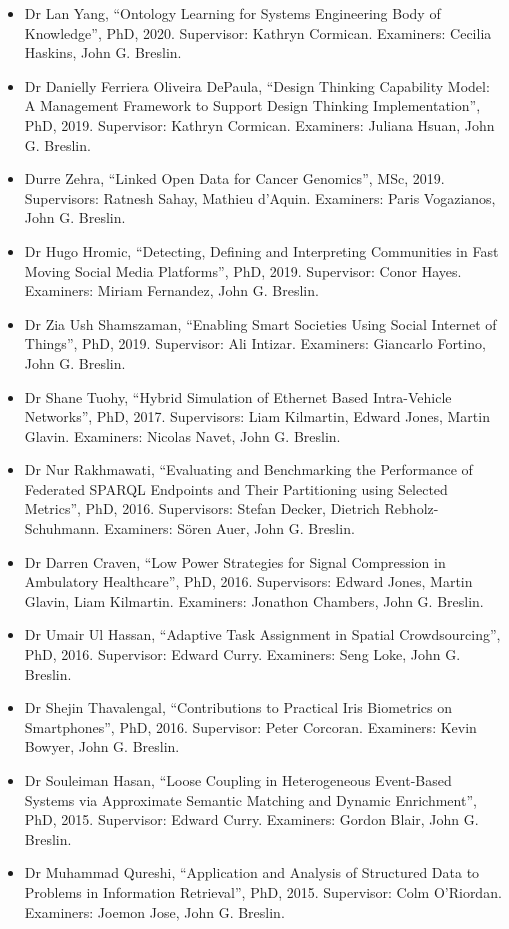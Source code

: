 \documentclass[10pt,a4paper]{res} %
\begin{document}
\begin{resume}
\begin{itemize}
\item Dr Lan Yang, ``Ontology Learning for Systems Engineering Body of Knowledge'', PhD, 2020. Supervisor: Kathryn Cormican. Examiners: Cecilia Haskins, John G. Breslin.
\item Dr Danielly Ferriera Oliveira DePaula, ``Design Thinking Capability Model: A Management Framework to Support Design Thinking Implementation'', PhD, 2019. Supervisor: Kathryn Cormican. Examiners: Juliana Hsuan, John G. Breslin.
\item Durre Zehra, ``Linked Open Data for Cancer Genomics'', MSc, 2019. Supervisors: Ratnesh Sahay, Mathieu d'Aquin. Examiners: Paris Vogazianos, John G. Breslin.
\item Dr Hugo Hromic, ``Detecting, Defining and Interpreting Communities in Fast Moving Social Media Platforms'', PhD, 2019. Supervisor: Conor Hayes. Examiners: Miriam Fernandez, John G. Breslin.
\item Dr Zia Ush Shamszaman, ``Enabling Smart Societies Using Social Internet of Things'', PhD, 2019. Supervisor: Ali Intizar. Examiners: Giancarlo Fortino, John G. Breslin.
\item Dr Shane Tuohy, ``Hybrid Simulation of Ethernet Based Intra-Vehicle Networks'', PhD, 2017. Supervisors: Liam Kilmartin, Edward Jones, Martin Glavin. Examiners: Nicolas Navet, John G. Breslin.
\item Dr Nur Rakhmawati, ``Evaluating and Benchmarking the Performance of Federated SPARQL Endpoints and Their Partitioning using Selected Metrics'', PhD, 2016. Supervisors: Stefan Decker, Dietrich Rebholz-Schuhmann. Examiners: S\"{o}ren Auer, John G. Breslin.
\item Dr Darren Craven, ``Low Power Strategies for Signal Compression in Ambulatory Healthcare'', PhD, 2016. Supervisors: Edward Jones, Martin Glavin, Liam Kilmartin. Examiners: Jonathon Chambers, John G. Breslin.
\item Dr Umair Ul Hassan, ``Adaptive Task Assignment in Spatial Crowdsourcing'', PhD, 2016. Supervisor: Edward Curry. Examiners: Seng Loke, John G. Breslin.
\item Dr Shejin Thavalengal, ``Contributions to Practical Iris Biometrics on Smartphones'', PhD, 2016. Supervisor: Peter Corcoran. Examiners: Kevin Bowyer, John G. Breslin.
\item Dr Souleiman Hasan, ``Loose Coupling in Heterogeneous Event-Based Systems via Approximate Semantic Matching and Dynamic Enrichment'', PhD, 2015. Supervisor: Edward Curry. Examiners: Gordon Blair, John G. Breslin.
\item Dr Muhammad Qureshi, ``Application and Analysis of Structured Data to Problems in Information Retrieval'', PhD, 2015. Supervisor: Colm O'Riordan. Examiners: Joemon Jose, John G. Breslin.

\end{itemize}
\end{resume}
\end{document}
